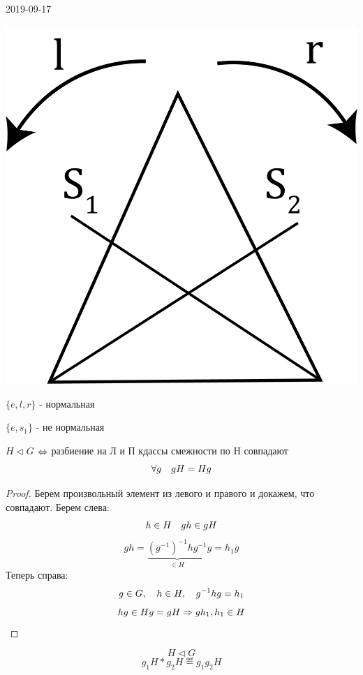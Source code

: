 \documentclass[main]{subfiles}
\begin{document}
\begin{lect} {2019-09-17}
\begin{example}
		    \includegraphics[scale=0.15]{pics/triangle_d_3.png}

		    $\{e,l,r\}$ - нормальная

		    $\{e, s_1\}$ - не нормальная
		\end{example}

		\begin{utv}
		    $H \triangleleft G$ $\Leftrightarrow$ разбиение на Л и П кдассы смежности по H совпадают
		    \[\forall g \quad gH = Hg\]
		\end{utv}

		\begin{proof}
		    Берем произвольный элемент из левого и правого и докажем, что совпадают. Берем слева:
		    \[h \in H \quad g h \in g H\]
		    \[g h = \underbrace{(g^{-1})^{-1} h g^{-1}}_{\in H} g = h_1 g\]
		    Теперь справа:
		    \[g \in G,\quad h \in H,\quad g^{-1}h g=h_1\]
		    \[h g \in H g = g H \Rightarrow g h_1, h_1 \in H\]
		\end{proof}

		\begin{Definition}
		    \[H \triangleleft G\]
		    \[g_1 H * g_2 H \eqdef g_1 g_2 H\]
		\end{Definition}


\end{lect}
\end{document}
